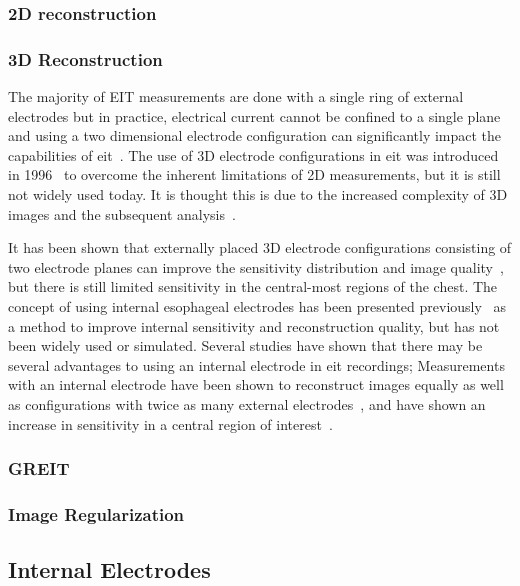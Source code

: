 \subsubsection{2D reconstruction}

\subsubsection{3D Reconstruction}
The majority of EIT measurements are done with a single ring of external electrodes but 
in practice, electrical current cannot  be confined to a single plane
and using a two dimensional electrode configuration can significantly
impact the capabilities of \acrshort{eit}~\parencite{Rabbani1991}.
The use of 3D electrode configurations in \acrshort{eit}
was introduced in 1996~\parencite{Metherall1996} to overcome the 
inherent limitations of 2D measurements, but it is still not widely used today.
It is thought this is due to the increased complexity of 3D images
and the subsequent analysis~\parencite{Grychtol2019}.

It has been shown that externally placed 3D electrode configurations
consisting of two electrode planes
can improve the sensitivity distribution and image quality~\parencite{Grychtol2016},
but there is still limited sensitivity in the central-most regions 
of the chest.
The concept of using internal esophageal electrodes has been presented
previously~\parencite{Pilkington1989,Schuessler1995}
as a method to improve internal sensitivity 
and reconstruction quality,
but has not been widely used or simulated.
Several studies have shown that there may be several advantages to using an internal
electrode in \acrshort{eit} recordings; 
Measurements with an internal electrode have been 
shown to reconstruct images equally as well as configurations with 
twice as many external electrodes~\parencite{Schuessler1995},
and have shown an increase in sensitivity in a central region 
of interest~\parencite{Kwon2013,Czaplik2014,Farooq2014}.

\subsubsection{GREIT}

\subsubsection{Image Regularization}


\subsection{Internal Electrodes}
